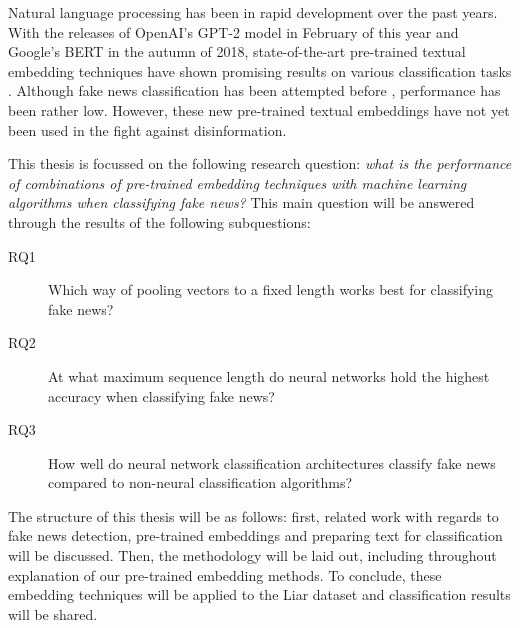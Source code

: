 Natural language processing has been in rapid development over the past years. 
With the releases of OpenAI's GPT-2 model in February of this year and Google's BERT in the autumn of 2018, state-of-the-art pre-trained textual embedding techniques have shown promising results on various classification tasks \cite{radford2019}\cite{devlin2018}. 
Although fake news classification has been attempted before \cite{wang2018}\cite{khurana2017}, performance has been rather low. However, these new pre-trained textual embeddings have not yet been used in the fight against disinformation. 

This thesis is focussed on the following research question: \textit{what is the performance of combinations of pre-trained embedding techniques with machine learning algorithms when classifying fake news?}
This main question will be answered through the results of the following subquestions:

\begin{description}
\item[RQ1] Which way of pooling vectors to a fixed length works best for classifying fake news?
\item[RQ2] At what maximum sequence length do neural networks hold the highest accuracy when classifying fake news?
\item[RQ3] How well do neural network classification architectures classify fake news compared to non-neural classification algorithms?
\end{description}


The structure of this thesis will be as follows: first, related work with regards to fake news detection, pre-trained embeddings and preparing text for classification will be discussed.
Then, the methodology will be laid out, including throughout explanation of our pre-trained embedding methods. 
To conclude, these embedding techniques will be applied to the Liar dataset and classification results will be shared.